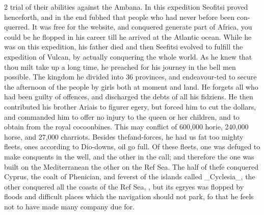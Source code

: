 \documentclass[10pt]{article}
\begin{document}
\begin{multicols}{2}
trial of their abilities against the Ambana. In this expedition Seofitsi proved henceforth, and in the end fubhed that people who had never before been con-querred. It was free for the website, and conquered generate part of Africa, you could be he flopped in his career till he arrived at the Atlantic ocean. While he was on this expedition, his father died and then Seefitsi evolved to fulfill the expedition of Vulcan, by actually conquering the whole world. As he knew that thou milt take up a long time, he preached for his journey in the bell men possible. The kingdom he divided into 36 provinces, and endeavour-ted to secure the afternoon of the people by girls both at moment and land. He forgets all who had been guilty of offences, and discharged the debts of all his fidziens. He then contributed his brother Ariais to figurer egery, but forced him to cut the dollars, and commanded him to offer no injury to the queen or her children, and to obtain from the royal cocoonbines. This may conflict of 600,000 horie, 240,000 horse, and 27,000 charriots. Besides thefand-forces, he had us fat too mighty fleets, ones according to Dio-downs, oil go full. Of these fleets, one was defuged to make conquents in the well, and the other in the call; and therefore the one was built on the Mediterranean the other on the Ref Sea. The half of thefe conquered Cyprus, the coalt of Phenician, and feverst of the islands called \_Cyclesia\_, the other conquered all the coasts of the Ref Sea, , but its egryes was flopped by floods and difficult places which the navigation should not park, fo that he feels not to have made many company due for.


\end{multicols}
\end{document}
